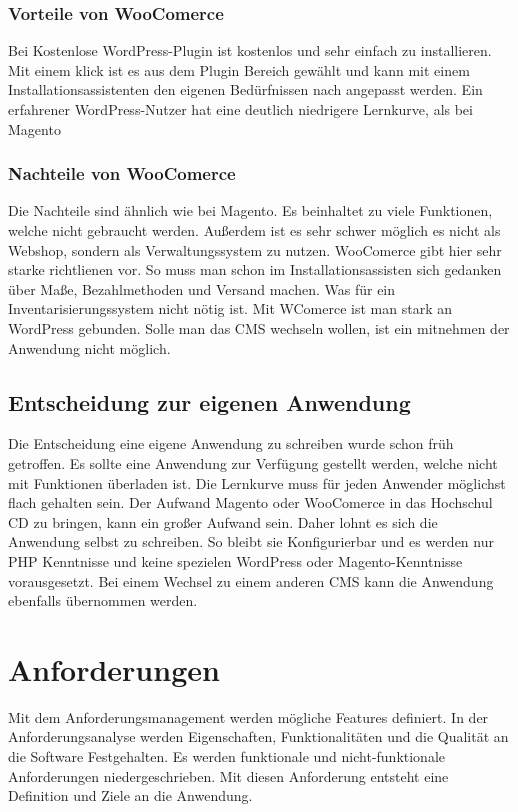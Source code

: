 \subsubsection{Vorteile von WooComerce}
Bei Kostenlose WordPress-Plugin ist kostenlos und sehr einfach zu installieren. Mit einem klick ist es aus dem Plugin Bereich gewählt und kann mit einem Installationsassistenten den eigenen Bedürfnissen nach angepasst werden. Ein erfahrener WordPress-Nutzer hat eine deutlich niedrigere Lernkurve, als bei Magento \autocite{WooComerce.2018}

\subsubsection{Nachteile von WooComerce}
Die Nachteile sind ähnlich wie bei Magento. Es beinhaltet zu viele Funktionen, welche nicht gebraucht werden. Außerdem ist es sehr schwer möglich es nicht als Webshop, sondern als Verwaltungssystem zu nutzen. WooComerce gibt hier sehr starke richtlienen vor. So muss man schon im Installationsassisten sich gedanken über Maße, Bezahlmethoden und Versand machen. Was für ein Inventarisierungssystem nicht nötig ist. Mit WComerce ist man stark an WordPress gebunden. Solle man das \ac{CMS} wechseln wollen, ist ein mitnehmen der Anwendung nicht möglich.

\subsection{Entscheidung zur eigenen Anwendung}
Die Entscheidung eine eigene Anwendung zu schreiben wurde schon früh getroffen. Es sollte eine Anwendung zur Verfügung gestellt werden, welche nicht mit Funktionen überladen ist. Die Lernkurve muss für jeden Anwender möglichst flach gehalten sein. Der Aufwand Magento oder WooComerce in das Hochschul \ac{CD} zu bringen, kann ein großer Aufwand sein. Daher lohnt es sich die Anwendung selbst zu schreiben. So bleibt sie Konfigurierbar und es werden nur \ac{PHP} Kenntnisse und keine spezielen WordPress oder Magento-Kenntnisse vorausgesetzt. Bei einem Wechsel zu einem anderen \ac{CMS} kann die Anwendung ebenfalls übernommen werden.

\section{Anforderungen}

Mit dem Anforderungsmanagement werden mögliche Features definiert. In der Anforderungsanalyse werden Eigenschaften, Funktionalitäten und die Qualität an die Software Festgehalten. \autocite{Grande.2014} Es werden funktionale und nicht-funktionale Anforderungen niedergeschrieben. Mit diesen Anforderung entsteht eine Definition und Ziele an die Anwendung.

